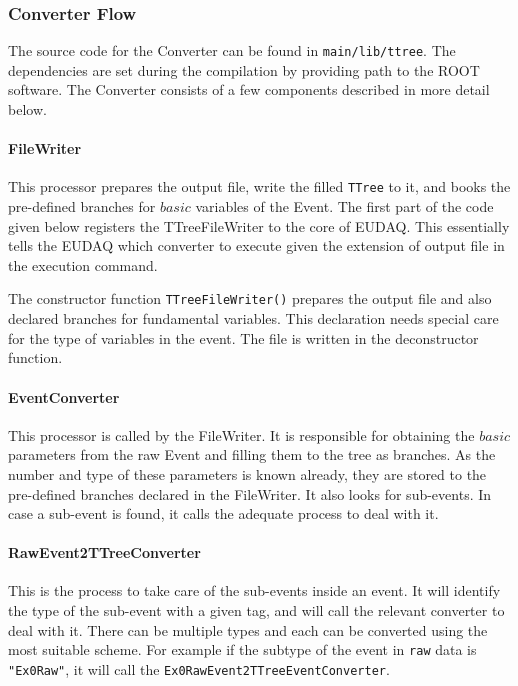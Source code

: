 \subsubsection{Converter Flow} 
 
The source code for the Converter can be found in \lstinline[style=cpp]{main/lib/ttree}. The dependencies are set during the compilation by providing path to the ROOT software. The Converter consists of a few components described in more detail below. 
  
\paragraph{FileWriter}
This processor prepares the output file, write the filled \lstinline[style=cpp]{TTree} to it, and books the pre-defined branches for $basic$ variables of the Event. The first part of the code given below registers the TTreeFileWriter to the core of EUDAQ. This essentially tells the EUDAQ which converter to execute given the extension of output file in the execution command. 

\begin{listing}[mybash]
    namespace{auto dummy01 = Factory<FileWriter>::Register<TTreeFileWriter, std::string&>(cstr2hash("root"));
\end{listing}

The constructor function \lstinline[style=cpp]{TTreeFileWriter()} prepares the output file and also declared branches for fundamental variables. This declaration needs special care for the type of variables in the event. The file is written in the deconstructor function.

\paragraph{EventConverter} This processor is called by the FileWriter. It is responsible for obtaining the $basic$ parameters from the raw Event and filling them to the tree as branches. As the number and type of these parameters is known already, they are stored to the pre-defined branches declared in the FileWriter. It also looks for sub-events. In case a sub-event is found, it calls the adequate process to deal with it. 
\paragraph{RawEvent2TTreeConverter} This is the process to take care of the sub-events inside an event. It will identify the type of the sub-event with a given tag, and will call the relevant converter to deal with it. There can be multiple types and each can be converted using the most suitable scheme. For example if the subtype of the event in \lstinline[style=cpp]{raw} data is \lstinline[style=cpp]{"Ex0Raw"}, it will call the \lstinline[style=cpp]{Ex0RawEvent2TTreeEventConverter}. 

